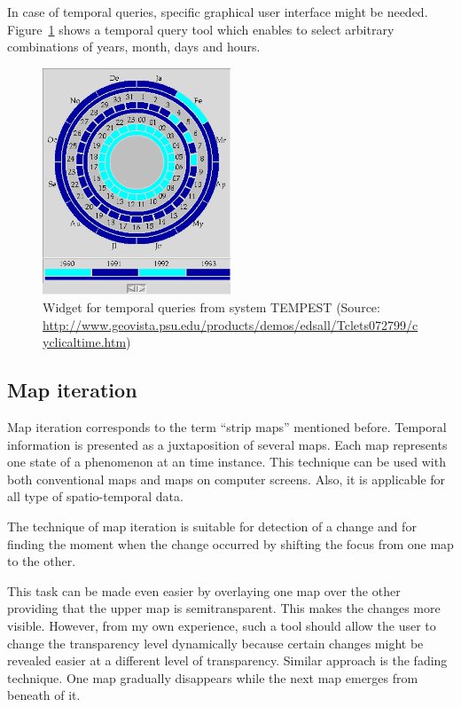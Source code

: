 \documentclass[a4paper,12pt,oneside]{book}
\begin{document}

In case of temporal queries, specific graphical user interface
might be needed. Figure~\ref{fig:cyclical_time} shows a temporal query tool
which enables to select arbitrary combinations of years, month, days and hours.


\begin{figure}[h!]
  \centering
  \includegraphics[width=0.5\textwidth]{./images/cyclical_time.png}
  \caption[Widget for temporal queries from system TEMPEST]
        {Widget for temporal queries from system TEMPEST (Source:
      \url{http://www.geovista.psu.edu/products/demos/edsall/Tclets072799/cyclicaltime.htm})}
  \label{fig:cyclical_time}
\end{figure}



\subsection{Map iteration}
\label{sec:mapIteration}
Map iteration corresponds to the term ``strip maps'' mentioned before.
Temporal information is presented as a juxtaposition of several maps.
Each map represents one state of a phenomenon at an time instance.
This technique can be used with both conventional maps and maps on computer screens.
Also, it is applicable for all type of spatio-temporal data.

The technique of map iteration is suitable
for detection of a change and for finding the moment when the change occurred
by shifting the focus from one map to the other.

This task can be made even easier by overlaying one map over the other providing that the upper map is semitransparent.
This makes the changes more visible.
However, from my own experience, such a tool should allow the user to change the transparency level dynamically
because certain changes might be revealed easier at a different level of transparency.
Similar approach is the fading technique.
One map gradually disappears while the next map emerges from beneath of it.
\end{document}
